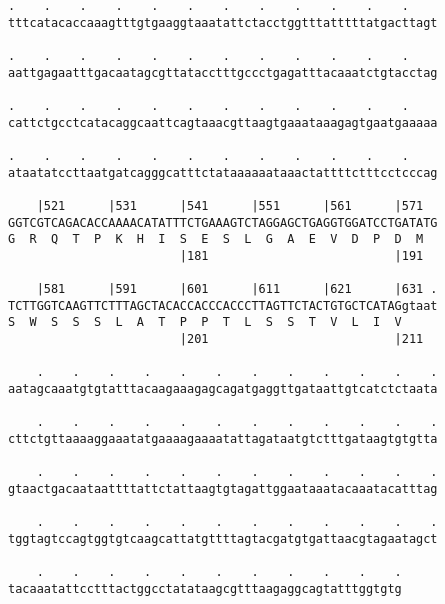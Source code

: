 \documentclass{article}
\begin{document}
\begin{Verbatim}
.    .    .    .    .    .    .    .    .    .    .    .    
tttcatacaccaaagtttgtgaaggtaaatattctacctggtttatttttatgacttagt
                                                            
.    .    .    .    .    .    .    .    .    .    .    .    
aattgagaatttgacaatagcgttatacctttgccctgagatttacaaatctgtacctag
                                                            
.    .    .    .    .    .    .    .    .    .    .    .    
cattctgcctcatacaggcaattcagtaaacgttaagtgaaataaagagtgaatgaaaaa
                                                            
.    .    .    .    .    .    .    .    .    .    .    .    
ataatatccttaatgatcagggcatttctataaaaaataaactattttctttcctcccag
                                                            
    |521      |531      |541      |551      |561      |571  
GGTCGTCAGACACCAAAACATATTTCTGAAAGTCTAGGAGCTGAGGTGGATCCTGATATG
G  R  Q  T  P  K  H  I  S  E  S  L  G  A  E  V  D  P  D  M  
                        |181                          |191  
  
    |581      |591      |601      |611      |621      |631 .
TCTTGGTCAAGTTCTTTAGCTACACCACCCACCCTTAGTTCTACTGTGCTCATAGgtaat
S  W  S  S  S  L  A  T  P  P  T  L  S  S  T  V  L  I  V     
                        |201                          |211  
  
    .    .    .    .    .    .    .    .    .    .    .    .
aatagcaaatgtgtatttacaagaaagagcagatgaggttgataattgtcatctctaata
                                                            
    .    .    .    .    .    .    .    .    .    .    .    .
cttctgttaaaaggaaatatgaaaagaaaatattagataatgtctttgataagtgtgtta
                                                            
    .    .    .    .    .    .    .    .    .    .    .    .
gtaactgacaataattttattctattaagtgtagattggaataaatacaaatacatttag
                                                            
    .    .    .    .    .    .    .    .    .    .    .    .
tggtagtccagtggtgtcaagcattatgttttagtacgatgtgattaacgtagaatagct
                                                            
    .    .    .    .    .    .    .    .    .    .    .
tacaaatattcctttactggcctatataagcgtttaagaggcagtatttggtgtg
                                                       
                                                       
 

\end{Verbatim}
\end{document}
